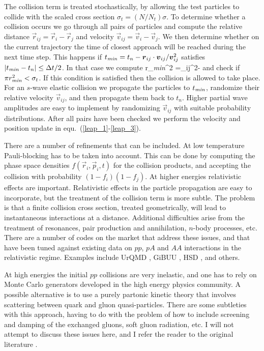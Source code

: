  The collision term is treated stochastically, by allowing the test particles
to collide with the scaled cross section $\sigma_t = (N/N_t)\sigma$. To 
determine whether a collision occurs we go through all pairs of particles
and compute the relative distance $\vec{r}_{ij} = \vec{r}_i-\vec{r}_j$
and velocity $\vec{v}_{ij} =\vec{v}_i-\vec{v}_j$. We then determine whether 
on the current trajectory the time of closest approach will be reached during 
the next time step. This happens if $t_{\it min} = t_n-\vec{r}_{ij}\cdot
\vec{v}_{ij}/\vec{v}_{ij}^2$ satisfies $|t_{\it min}-t_n|\leq \Delta t/2$. 
In that case we compute  
\be
r_{\it min}^2 =_{ij}^2-
\ee
and check if $\pi r_{\it min}^2 < \sigma_t$. If this condition is satisfied 
then the collision is allowed to take place. For an $s$-wave elastic 
collision we propagate the particles to $t_{\it min}$, randomize their 
relative velocity $\vec{v}_{ij}$, and then propagate them back to $t_n$. 
Higher partial wave amplitudes are easy to implement by randomizing 
$\vec{v}_{ij}$ with suitable probability distributions. After all pairs 
have been checked we perform the velocity and position update in 
equ.~(\ref{leap_1}-\ref{leap_3}). 

 There are a number of refinements that can be included. At low temperature 
Pauli-blocking has to be taken into account. This can be done by computing
the phase space densities $f(\vec{r}_i,\vec{p}_i,t)$ for the collision
products, and accepting the collision with probability $(1-f_i)(1-f_j)$.
At higher energies relativistic effects are important. Relativistic 
effects in the particle propagation are easy to incorporate, but the
treatment of the collision term is more subtle. The problem is that 
a finite collision cross section, treated geometrically, will lead
to instantaneous interactions at a distance. Additional difficulties
arise from the treatment of resonances, pair production and annihilation, 
$n$-body processes, etc. There are a number of codes on the market 
that address these issues, and that have been tuned against existing
data on $pp$, $pA$ and $AA$ interactions in the relativistic 
regime. Examples include UrQMD \cite{Bass:1998ca}, GiBUU \cite{Buss:2011mx}, 
HSD \cite{Ehehalt:1996uq}, and others. 

 At high energies the initial $pp$ collisions are very inelastic, and
one has to rely on Monte Carlo generators developed in the high energy
physics community. A possible alternative is to use a purely partonic
kinetic theory that involves scattering between quark and gluon 
quasi-particles. There are some subtleties with this approach, having 
to do with the problem of how to include screening and damping of the 
exchanged gluons, soft gluon radiation, etc. I will not attempt to 
discuss these issues here, and I refer the reader to the original 
literature \cite{Geiger:1991nj,Xu:2004mz}.


